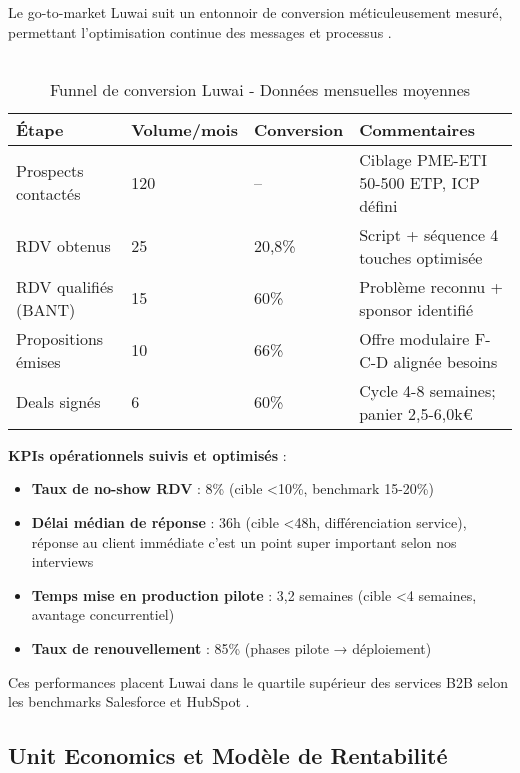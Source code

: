 Le go-to-market Luwai suit un entonnoir de conversion méticuleusement mesuré, permettant l'optimisation continue des messages et processus \cite{luwai2025funnel}.
\\\\
\begin{table}[ht]
\centering
\caption{Funnel de conversion Luwai - Données mensuelles moyennes}
\label{tab:luwai_funnel}
\begin{tabular}{@{}p{5cm}p{3cm}p{3cm}p{4cm}@{}}
\toprule
\textbf{Étape} & \textbf{Volume/mois} & \textbf{Conversion} & \textbf{Commentaires} \\
\midrule
Prospects contactés & 120 & -- & Ciblage PME-ETI 50-500 ETP, ICP défini \\
RDV obtenus & 25 & 20,8\% & Script + séquence 4 touches optimisée \\
RDV qualifiés (BANT) & 15 & 60\% & Problème reconnu + sponsor identifié \\
Propositions émises & 10 & 66\% & Offre modulaire F-C-D alignée besoins \\
Deals signés & 6 & 60\% & Cycle 4-8 semaines; panier 2,5-6,0k€ \\
\bottomrule
\end{tabular}
\end{table}
\medskip
\textbf{KPIs opérationnels suivis et optimisés} :
\begin{itemize}
    \item \textbf{Taux de no-show RDV} : 8\% (cible <10\%, benchmark 15-20\%)
    \item \textbf{Délai médian de réponse} : 36h (cible <48h, différenciation service), réponse au client immédiate c'est un point super important selon nos interviews
    \item \textbf{Temps mise en production pilote} : 3,2 semaines (cible <4 semaines, avantage concurrentiel)
    \item \textbf{Taux de renouvellement} : 85\% (phases pilote → déploiement)
\end{itemize}
\medskip
Ces performances placent Luwai dans le quartile supérieur des services B2B selon les benchmarks Salesforce et HubSpot \cite{hubspot2024sales}.

\subsection{Unit Economics et Modèle de Rentabilité}

